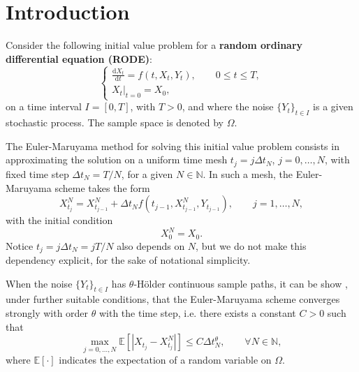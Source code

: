 \documentclass[reqno,12pt]{amsart}
\theoremstyle{plain}%
\theoremstyle{definition}
\begin{document}
\maketitle

\section{Introduction}

Consider the following initial value problem for a \textbf{random ordinary differential equation (RODE)}:
\begin{equation}
  \label{rodeeq}
  \begin{cases}
    \displaystyle \frac{\mathrm{d}X_t}{\mathrm{d} t} = f(t, X_t, Y_t), \qquad 0 \leq t \leq T, \\
    \left. X_t \right|_{t = 0} = X_0,
  \end{cases}
\end{equation}
on a time interval $I=[0, T]$, with $T > 0$, and where the noise $\{Y_t\}_{t\in I}$ is a given stochastic process. The sample space is denoted by $\Omega$.

The Euler-Maruyama method for solving this initial value problem consists in approximating the solution on a uniform time mesh $t_j = j\Delta t_N$, $j = 0, \ldots, N$, with fixed time step $\Delta t_N = T/N$, for a given $N\in \mathbb{N}$. In such a mesh, the Euler-Maruyama scheme takes the form
\begin{equation}
  \label{emscheme}
  X_{t_j}^N = X_{t_{j-1}}^N + \Delta t_N f(t_{j-1}, X_{t_{j-1}}^N, Y_{t_{j-1}}), \qquad j = 1, \ldots, N,
\end{equation}
with the initial condition
\begin{equation}
  \label{iccondition}
  X_0^N = X_0.
\end{equation}
Notice $t_j = j\Delta t_N = jT/N$ also depends on $N$, but we do not make this dependency explicit, for the sake of notational simplicity.

When the noise $\{Y_t\}_{t\in I}$ has $\theta$-H\"older continuous sample paths, it can be show \cite{GruneKloeden2001}, under further suitable conditions, that the Euler-Maruyama scheme converges strongly with order $\theta$ with the time step, i.e. there exists a constant $C > 0$ such that
\begin{equation}
    \label{strongordertheta}
    \max_{j=0, \ldots, N}\mathbb{E}\left[ \left| X_{t_j} - X_{t_j}^N \right| \right] \leq C \Delta t_N^\theta, \qquad \forall N \in \mathbb{N},
\end{equation}
where $\mathbb{E}[\cdot]$ indicates the expectation of a random variable on $\Omega$.
\end{document}
